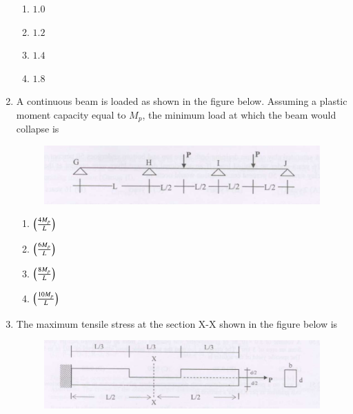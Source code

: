 \documentclass[journal]{IEEEtran}
\begin{document}
\begin{enumerate}
\begin{enumerate}
\item $1.0$
\item $1.2$
\item $1.4$
\item $1.8$
\end{enumerate}

\item A continuous beam is loaded as shown in the figure below. Assuming a plastic moment capacity equal to $M_p$, the minimum load at which the beam would collapse is \textbf{}

\begin{figure}[h]
    \centering
    \includegraphics[width=0.8\columnwidth]{figs/fig1.png} 

\end{figure}
\begin{multicols}{2}

\begin{enumerate}
\item $\left(\frac{4M_p}{L}\right)$
\vspace{0.1cm}
\item $\left(\frac{6M_p}{L}\right)$
\item $\left(\frac{8M_p}{L}\right)$
\vspace{0.1cm}
\item $\left(\frac{10M_p}{L}\right)$
\end{enumerate}     
\end{multicols}

\item The maximum tensile stress at the section X-X shown in the figure below is \textbf{}

\begin{figure}[h]
    \centering
    \includegraphics[width=0.8\columnwidth]{figs/fig2.png} 

\end{figure}
\begin{multicols}{2}


\end{multicols}
\end{enumerate}
\end{document}
